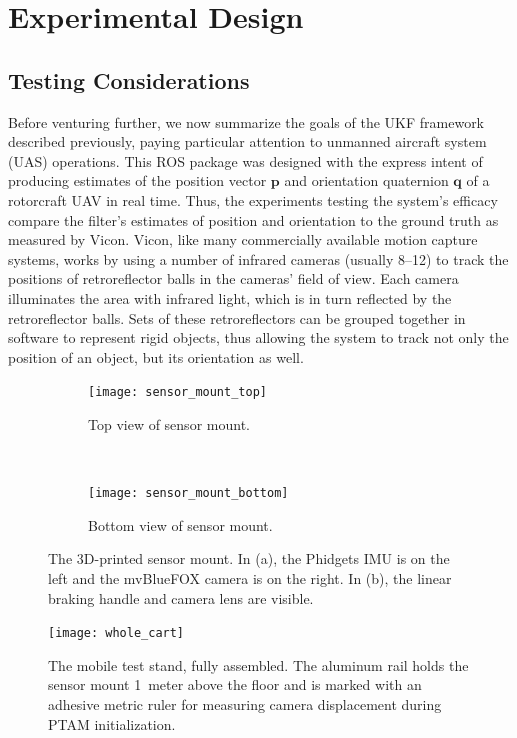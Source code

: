 \chapter{Experimental Design} \label{ch:Exp_Design}

\section{Testing Considerations}

Before venturing further, we now summarize the goals of the UKF framework described previously, paying particular attention to unmanned aircraft system (UAS) operations. This ROS package was designed with the express intent of producing estimates of the position vector $\mathbf{p}$ and orientation quaternion $\mathbf{q}$ of a rotorcraft UAV in real time. Thus, the experiments testing the system's efficacy compare the filter's estimates of position and orientation to the ground truth as measured by Vicon. Vicon, like many commercially available motion capture systems, works by using a number of infrared cameras (usually 8--12) to track the positions of retroreflector balls in the cameras' field of view. Each camera illuminates the area with infrared light, which is in turn reflected by the retroreflector balls. Sets of these retroreflectors can be grouped together in software to represent rigid objects, thus allowing the system to track not only the position of an object, but its orientation as well.

\begin{figure}[t]
    \centering
    \begin{subfigure}[t]{0.5\textwidth}
        \centering
        \texttt{[image: sensor\_mount\_top]}
        \caption{Top view of sensor mount.}
    \end{subfigure}%
    ~ 
    \begin{subfigure}[t]{0.5\textwidth}
        \centering
        \texttt{[image: sensor\_mount\_bottom]}
        \caption{Bottom view of sensor mount.}
    \end{subfigure}
    \caption[3D-printed Sensor Mount]{The 3D-printed sensor mount. In (a), the Phidgets IMU is on the left and the mvBlueFOX camera is on the right. In (b), the linear braking handle and camera lens are visible.}
    \label{fig:sensor_mount}
\end{figure}

\begin{figure}
  \centering
    \texttt{[image: whole\_cart]}
  \caption[Mobile Test Stand]{The mobile test stand, fully assembled. The aluminum rail holds the sensor mount 1~meter above the floor and is marked with an adhesive metric ruler for measuring camera displacement during PTAM initialization.}
  \label{fig:whole_cart}
\end{figure}

